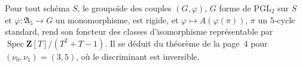 \begin{encadre}
\begin{corollaire}\nonverifie
Pour tout schéma $S$, le groupoïde des couples $(G, \varphi)$, $G$ forme de $\mathrm{PGL}_2$ sur $S$ et $\varphi : \mathfrak A_5 \to G$ un monomorphisme, est rigide, et $\varphi \mapsto A(\varphi(\pi))$, $\pi$ un $5$-cycle standard, rend son foncteur des classes d'isomorphisme représentable par $\operatorname{Spec} \mathbf Z[T]/(T^2 + T - 1)$. Il se déduit du théorème de la page~4 pour $(\nu_0, \nu_1) = (3, 5)$, où le discriminant est inversible.
\end{corollaire}
\end{encadre}
